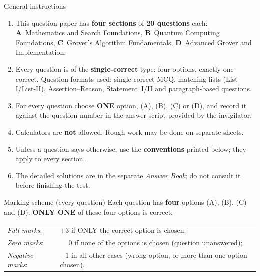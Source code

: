 \documentclass[11pt,a4paper]{article}
\begin{document}
\vspace{6pt}
\begin{infobox}{General instructions}
\begin{enumerate}[leftmargin=1.4em, itemsep=1pt, topsep=1pt]
\item This question paper has \textbf{four sections} of \textbf{20 questions} each:
\textbf{A}~Mathematics and Search Foundations, \textbf{B}~Quantum Computing Foundations, \textbf{C}~Grover's Algorithm Fundamentals, \textbf{D}~Advanced Grover and Implementation.
\item Every question is of the \textbf{single-correct} type: four options, exactly one correct. Question formats used:
single-correct MCQ, matching lists (List-I/List-II), Assertion--Reason, Statement~I/II and paragraph-based questions.
\item For every question choose \textbf{ONE} option, (A), (B), (C) or (D), and record it against the question number in the answer script provided by the invigilator.
\item Calculators are \textbf{not} allowed. Rough work may be done on separate sheets.
\item Unless a question says otherwise, use the \textbf{conventions} printed below; they apply to every section.
\item The detailed solutions are in the separate \emph{Answer Book}; do not consult it before finishing the test.
\end{enumerate}
\end{infobox}
\begin{infobox}{Marking scheme (every question)}
Each question has \textbf{four} options (A), (B), (C) and (D). \textbf{ONLY ONE} of these four options is correct.\\[2pt]
\begin{tabular}{@{}ll@{}}
\emph{Full marks}: & $+3$ if ONLY the correct option is chosen;\\
\emph{Zero marks}: & $\phantom{+}0$ if none of the options is chosen (question unanswered);\\
\emph{Negative marks}: & $-1$ in all other cases (wrong option, or more than one option chosen).
\end{tabular}
\end{infobox}
\end{document}
